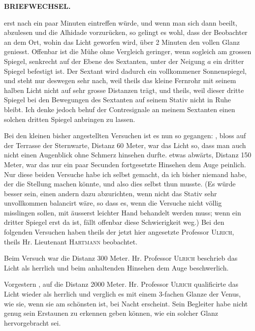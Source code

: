 \par\clearpage
\noindent{}\hfill{\small\textbf{BRIEFWECHSEL.}}\hfill\null\par\medskip
\noindent erst nach ein paar Minuten eintreffen würde, und wenn man sich dann beeilt, abzulesen und die Alhidade vorzurücken, so gelingt es wohl, dass der Beobachter an dem Ort, wohin das Licht geworfen wird, über 2 Minuten den vollen Glanz geniesst. Offenbar ist die Mühe ohne Vergleich geringer, wenn sogleich am grossen Spiegel, senkrecht auf der Ebene des Sextanten, unter der Neigung $a$ ein dritter Spiegel befestigt ist. Der Sextant wird dadurch ein vollkommener Sonnenspiegel, und steht nur deswegen sehr nach, weil theils das kleine Fernrohr mit seinem halben Licht nicht auf sehr grosse Distanzen trägt, und theils, weil dieser dritte Spiegel bei den Bewegungen des Sextanten auf seinem Stativ nicht in Ruhe bleibt. Ich denke jedoch behuf der Contresignale an meinem Sextanten einen solchen dritten Spiegel anbringen zu lassen.

\par\noindent\hspace*{\parindent}Bei den kleinen bisher angestellten Versuchen ist es nun so gegangen: , bloss auf der Terrasse der Sternwarte, Distanz 60 Meter, war das Licht so, dass man auch nicht einen Augenblick ohne Schmerz hinsehen durfte.  etwas abwärts, Distanz 150 Meter, war das nur ein paar Secunden fortgesetzte Hinsehen dem Auge peinlich. Nur diese beiden Versuche habe ich selbst gemacht, da ich bisher niemand habe, der die Stellung machen könnte, und also dies selbst thun musste. (Es würde besser sein, einen andern dazu abzurichten, wenn nicht das Stativ sehr unvollkommen balancirt wäre, so dass es, wenn die Versuche nicht völlig misslingen sollen, mit äusserst leichter Hand behandelt werden muss; wenn ein dritter Spiegel erst da ist, fällt offenbar diese Schwierigkeit weg.) Bei den folgenden Versuchen haben theils der jetzt hier angesetzte Professor \textsc{Ulrich}, theils Hr. Lieutenant \textsc{Hartmann} beobachtet.

\par\noindent\hspace*{\parindent}Beim  Versuch war die Distanz 300 Meter. Hr. Professor \textsc{Ulrich} beschrieb das Licht als herrlich und beim anhaltenden Hinsehen dem Auge beschwerlich.

\par\noindent\hspace*{\parindent}Vorgestern , auf die Distanz 2000 Meter. Hr. Professor \textsc{Ulrich} qualificirte das Licht wieder als herrlich und verglich es mit einem 3-fachen Glanze der Venus, wie sie, wenn sie am schönsten ist, bei Nacht erscheint. Sein Begleiter habe nicht genug sein Erstaunen zu erkennen geben können, wie ein solcher Glanz hervorgebracht sei.

